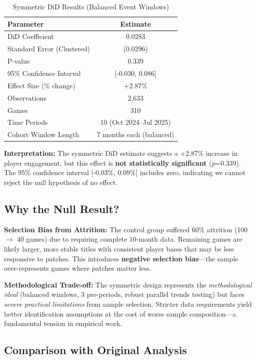 \documentclass[12pt,a4paper]{article}
\begin{document}
\begin{table}[H]
\centering
\caption{Symmetric DiD Results (Balanced Event Windows)}
\label{tab:symmetric-results}
\begin{tabular}{lc}
\toprule
\textbf{Parameter} & \textbf{Estimate} \\
\midrule
DiD Coefficient & 0.0283 \\
Standard Error (Clustered) & (0.0296) \\
P-value & 0.339 \\
95\% Confidence Interval & [-0.030, 0.086] \\
Effect Size (\% change) & +2.87\% \\
\midrule
Observations & 2,633 \\
Games & 310 \\
Time Periods & 10 (Oct 2024--Jul 2025) \\
Cohort Window Length & 7 months each (balanced) \\
\bottomrule
\end{tabular}
\end{table}

\textbf{Interpretation:} The symmetric DiD estimate suggests a +2.87\% increase in player engagement, but this effect is \textbf{not statistically significant} (\textit{p}=0.339). The 95\% confidence interval [-0.03\%, 0.09\%] includes zero, indicating we cannot reject the null hypothesis of no effect.

\subsection{Why the Null Result?}

\textbf{Selection Bias from Attrition:} The control group suffered 60\% attrition (100 $\rightarrow$ 40 games) due to requiring complete 10-month data. Remaining games are likely larger, more stable titles with consistent player bases that may be less responsive to patches. This introduces \textbf{negative selection bias}---the sample over-represents games where patches matter less.

\textbf{Methodological Trade-off:} The symmetric design represents the \textit{methodological ideal} (balanced windows, 3 pre-periods, robust parallel trends testing) but faces \textit{severe practical limitations} from sample selection. Stricter data requirements yield better identification assumptions at the cost of worse sample composition---a fundamental tension in empirical work.

\subsection{Comparison with Original Analysis}
\end{document}
